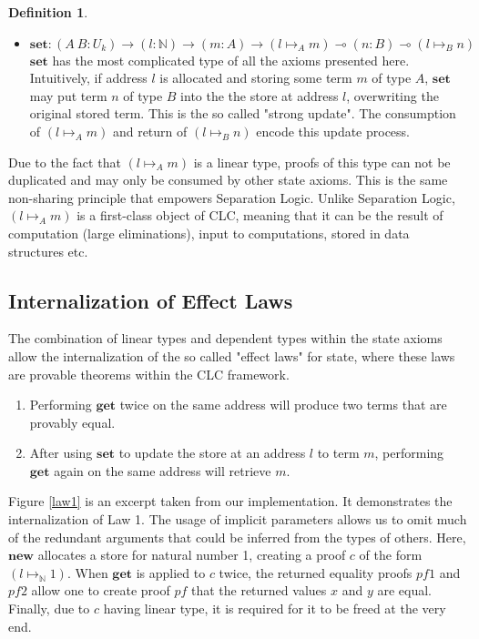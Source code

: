 \documentclass[sigplan,screen]{acmart}
\theoremstyle{definition}
\newtheorem{definition}{Definition}[section]
\newcommand{\new}{\textbf{new}}
\newcommand{\get}{\textbf{get}}
\newcommand{\set}{\textbf{set}}
\begin{document}
\begin{definition}
\begin{itemize}
      \item $\set : (A\ B : U_k) \rightarrow (l : \mathbb{N}) \rightarrow (m : A) \rightarrow (l \mapsto_A m) \multimap (n : B) \multimap (l \mapsto_B n)$ \\
      $\set$ has the most complicated type of all the axioms presented here. Intuitively, if address $l$ is allocated and storing some term $m$ of type $A$, $\set$ may put term $n$ of type $B$ into the the store at address $l$, overwriting the original stored term. This is the so called "strong update". The consumption of $(l \mapsto_A m)$ and return of $(l \mapsto_B n)$ encode this update process.
    \end{itemize}
  \end{definition}
  Due to the fact that $(l \mapsto_A m)$ is a linear type, proofs of this type can not be duplicated and may only be consumed by other state axioms. This is the same non-sharing principle that empowers Separation Logic. Unlike Separation Logic, $(l \mapsto_A m)$ is a first-class object of CLC, meaning that it can be the result of computation (large eliminations), input to computations, stored in data structures etc.

  \subsection{Internalization of Effect Laws}
  The combination of linear types and dependent types within the state axioms allow the internalization of the so called "effect laws" for state, where these laws are provable theorems within the CLC framework.

  \begin{enumerate}
    \item Performing $\get$ twice on the same address will produce two terms that are provably equal.
    \item After using $\set$ to update the store at an address $l$ to term $m$, performing $\get$ again on the same address will retrieve $m$.
  \end{enumerate}

  Figure \ref{law1} is an excerpt taken from our implementation. It demonstrates the internalization of Law 1. The usage of implicit parameters allows us to omit much of the redundant arguments that could be inferred from the types of others. Here, $\new$ allocates a store for natural number 1, creating a proof $c$ of the form $(l \mapsto_\mathbb{N} 1)$. When $\get$ is applied to $c$ twice, the returned equality proofs $pf1$ and $pf2$ allow one to create proof $pf$ that the returned values $x$ and $y$ are equal. Finally, due to $c$ having linear type, it is required for it to be freed at the very end.
\end{document}

